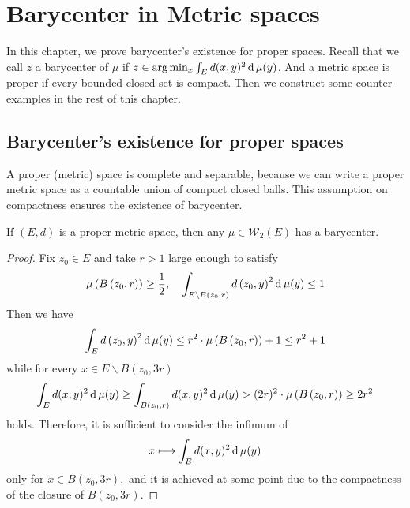 \chapter{Barycenter in Metric spaces}
\label{chapter:metric_spaces}

In this chapter, we prove barycenter's existence for proper spaces\cite[Lemma 3.2]{ohta2012barycenters}.
Recall that we call $z$ a barycenter of $\mu$ if $ z \in \arg\min_{x}\int_{E} d(x, y)^2 \operatorname{d} \mu (y)$.
And a metric space is proper if every bounded closed set is compact.
Then we construct some counter-examples in the rest of this chapter.


\section{Barycenter's existence for proper spaces}

A proper (metric) space is complete and separable,
because we can write a proper metric space as a countable union of compact closed balls.
This assumption on compactness ensures the existence of barycenter.

\begin{prop}
	\label{lem:existence_proper_spaces}
	If \( ( E , d ) \) is a proper metric space, then any \( \mu \in \mathcal{W}_ { 2 } ( E ) \) has a barycenter.
\end{prop}

\begin{proof}
	Fix \( z _ { 0 } \in E \) and take \( r > 1 \) large enough to satisfy
	\[ \mu \left( B \left( z _ { 0 } , r \right) \right) \geq \frac { 1 } { 2 } , \quad \int _ { E \backslash B \left( z _ { 0 } , r \right) } d \left( z _ { 0 } , y \right) ^ { 2 } \operatorname{d} \mu ( y ) \leq 1 \]
	Then we have
	\[ \int _ { E } d \left( z _ { 0 } , y \right) ^ { 2 } \operatorname{d} \mu ( y ) \leq r ^ { 2 } \cdot \mu \left( B \left( z _ { 0 } , r \right) \right) + 1 \leq r ^ { 2 } + 1 \]
	while for every \( x \in E \backslash B \left( z _ { 0 } , 3 r \right) \)
	\[ \int _ { E } d ( x , y ) ^ { 2 } \operatorname{d} \mu ( y ) \geq \int _ { B \left( z _ { 0 } , r \right) } d ( x , y ) ^ { 2 } \operatorname{d} \mu ( y ) > ( 2 r ) ^ { 2 } \cdot \mu \left( B \left( z _ { 0 } , r \right) \right) \geq 2 r ^ { 2 } \]
	holds.
	Therefore, it is sufficient to consider the infimum of
	\[ x \longmapsto \int _ { E } d ( x , y ) ^ { 2 } \operatorname{d} \mu ( y ) \]
	only for \( x \in B \left( z _ { 0 } , 3 r \right) , \) and it is achieved at some point due to the compactness of the closure of \( B \left( z _ { 0 } , 3 r \right) . \)
\end{proof}

